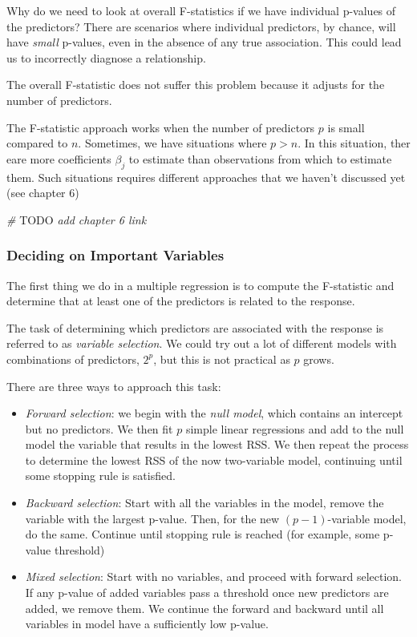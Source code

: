\documentclass[]{book}
\newenvironment{Shaded}{\begin{snugshade}}{\end{snugshade}}
\newcommand{\AlertTok}[1]{\textcolor[rgb]{0.94,0.16,0.16}{#1}}
\newcommand{\CommentTok}[1]{\textcolor[rgb]{0.56,0.35,0.01}{\textit{#1}}}
\begin{document}
Why do we need to look at overall F-statistics if we have individual p-values of the predictors? There are scenarios where individual predictors, by chance, will have \emph{small} p-values, even in the absence of any true association. This could lead us to incorrectly diagnose a relationship.

The overall F-statistic does not suffer this problem because it adjusts for the number of predictors.

The F-statistic approach works when the number of predictors \(p\) is small compared to \(n\). Sometimes, we have situations where \(p > n\). In this situation, ther eare more coefficients \(\beta_j\) to estimate than observations from which to estimate them. Such situations requires different approaches that we haven't discussed yet (see chapter 6)

\begin{Shaded}
\begin{Highlighting}[]
\CommentTok{# }\AlertTok{TODO}\CommentTok{ add chapter 6 link}
\end{Highlighting}
\end{Shaded}

\hypertarget{deciding-on-important-variables}{%
\subsubsection{Deciding on Important Variables}\label{deciding-on-important-variables}}

The first thing we do in a multiple regression is to compute the F-statistic and determine that at least one of the predictors is related to the response.

The task of determining which predictors are associated with the response is referred to as \emph{variable selection}. We could try out a lot of different models with combinations of predictors, \(2^p\), but this is not practical as \(p\) grows.

There are three ways to approach this task:

\begin{itemize}
\item
  \emph{Forward selection}: we begin with the \emph{null model}, which contains an intercept but no predictors. We then fit \(p\) simple linear regressions and add to the null model the variable that results in the lowest RSS. We then repeat the process to determine the lowest RSS of the now two-variable model, continuing until some stopping rule is satisfied.
\item
  \emph{Backward selection}: Start with all the variables in the model, remove the variable with the largest p-value. Then, for the new \((p - 1)\)-variable model, do the same. Continue until stopping rule is reached (for example, some p-value threshold)
\item
  \emph{Mixed selection}: Start with no variables, and proceed with forward selection. If any p-value of added variables pass a threshold once new predictors are added, we remove them. We continue the forward and backward until all variables in model have a sufficiently low p-value.
\end{itemize}
\end{document}
